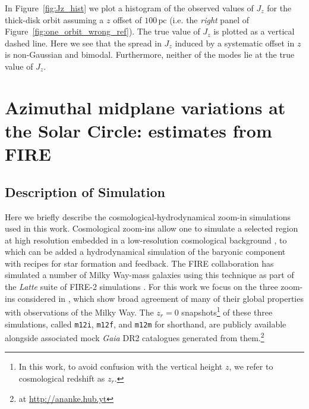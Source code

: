 \documentclass[twocolumn]{aastex62}
\newcommand{\pc}{\text{pc}}
\newcommand{\mi}{\texttt{m12i}}
\newcommand{\mf}{\texttt{m12f}}
\newcommand{\mm}{\texttt{m12m}}
\newcommand{\z}{z_r}
\begin{document}
In Figure~\ref{fig:Jz_hist} we plot a histogram of the observed values of
$J_z$ for the thick-disk orbit assuming a $z$ offset of $100\,\pc$ (i.e. the
{\em right} panel of Figure~\ref{fig:one_orbit_wrong_ref}). The true value of
$J_z$ is plotted as a vertical dashed line. Here we see that the spread in
$J_z$ induced by a systematic offset in $z$ is non-Gaussian and bimodal.
Furthermore, neither of the modes lie at the true value of $J_z$.

\section{Azimuthal midplane variations at the Solar Circle: estimates from
FIRE} \label{sec:local_fire}
\subsection{Description of Simulation} \label{ssec:cosmozoom}
Here we briefly describe the cosmological-hydrodynamical zoom-in simulations
used in this work. Cosmological zoom-ins allow one to simulate a selected
region at high resolution embedded in a low-resolution cosmological background
\citep[e.g.][]{1993ApJ...412..455K,2014MNRAS.437.1894O}, to which can be added
a hydrodynamical simulation of the baryonic component with recipes for star
formation and feedback. The FIRE collaboration has simulated a number of Milky
Way-mass galaxies using this technique as part of the {\em Latte} suite of
FIRE-2 simulations \citep{2016ApJ...827L..23W,2018MNRAS.481.4133G}. For this
work we focus on the three zoom-ins considered in \citet{2018arXiv180610564S},
which show broad agreement of many of their global properties with
observations of the Milky Way. The $\z=0$ snapshots\footnote{In this work, to
avoid confusion with the vertical height $z$, we refer to cosmological
redshift as $\z$.} of these three simulations, called \mi , \mf , and \mm{}
for shorthand, are publicly available alongside associated mock {\em Gaia} DR2
catalogues generated from them.\footnote{at \url{http://ananke.hub.yt}}
\end{document}
